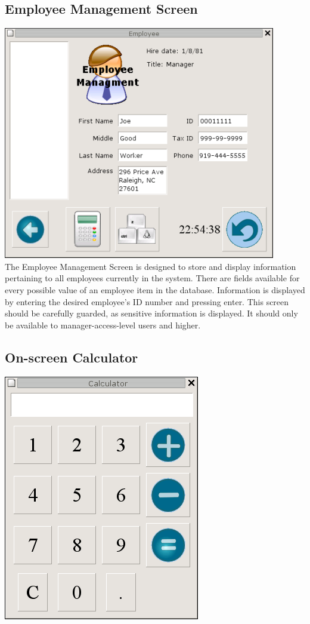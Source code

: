 \documentclass{report}
\begin{document}
    \subsection{Employee Management Screen}
    \includegraphics{ys_employee_screener.png}\\

    The Employee Management Screen is designed to store and
    display information pertaining to all employees currently in the
    system.  There are fields available for every possible value
    of an employee item in the database.  Information is displayed
    by entering the desired employee's ID number and pressing
    enter.  This screen should be carefully guarded, as sensitive
    information is displayed.  It should only be available to
    manager-access-level users and higher.\\

    \newpage

    \subsection{On-screen Calculator}
    \includegraphics{ys_calc_screener.png}\\
\end{document}
